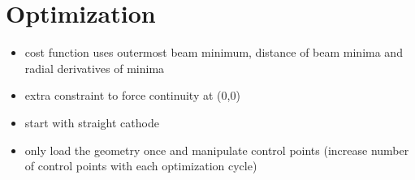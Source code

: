 \section{Optimization}
\begin{itemize}
  \item cost function uses outermost beam minimum, distance of beam minima and radial derivatives of minima
  \item extra constraint to force continuity at (0,0)
  \item start with straight cathode
  \item only load the geometry once and manipulate control points (increase number of control points with each optimization cycle)
\end{itemize}
